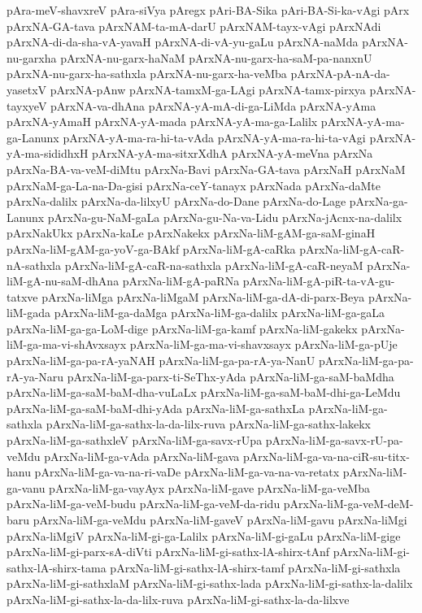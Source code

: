 {pAra-meV-shavxreV
pAra-siVya
pAregx
pAri-BA-Sika
pAri-BA-Si-ka-vAgi
pArx
pArxNA-GA-tava
pArxNAM-ta-mA-darU
pArxNAM-tayx-vAgi
pArxNAdi
pArxNA-di-da-sha-vA-yavaH
pArxNA-di-vA-yu-gaLu
pArxNA-naMda
pArxNA-nu-garxha
pArxNA-nu-garx-haNaM
pArxNA-nu-garx-ha-saM-pa-nanxnU
pArxNA-nu-garx-ha-sathxla
pArxNA-nu-garx-ha-veMba
pArxNA-pA-nA-da-yasetxV
pArxNA-pAnw
pArxNA-tamxM-ga-LAgi
pArxNA-tamx-pirxya
pArxNA-tayxyeV
pArxNA-va-dhAna
pArxNA-yA-mA-di-ga-LiMda
pArxNA-yAma
pArxNA-yAmaH
pArxNA-yA-mada
pArxNA-yA-ma-ga-Lalilx
pArxNA-yA-ma-ga-Lanunx
pArxNA-yA-ma-ra-hi-ta-vAda
pArxNA-yA-ma-ra-hi-ta-vAgi
pArxNA-yA-ma-sididhxH
pArxNA-yA-ma-sitxrXdhA
pArxNA-yA-meVna
pArxNa
pArxNa-BA-va-veM-diMtu
pArxNa-Bavi
pArxNa-GA-tava
pArxNaH
pArxNaM
pArxNaM-ga-La-na-Da-gisi
pArxNa-ceY-tanayx
pArxNada
pArxNa-daMte
pArxNa-dalilx
pArxNa-da-lilxyU
pArxNa-do-Dane
pArxNa-do-Lage
pArxNa-ga-Lanunx
pArxNa-gu-NaM-gaLa
pArxNa-gu-Na-va-Lidu
pArxNa-jAcnx-na-dalilx
pArxNakUkx
pArxNa-kaLe
pArxNakekx
pArxNa-liM-gAM-ga-saM-ginaH
pArxNa-liM-gAM-ga-yoV-ga-BAkf
pArxNa-liM-gA-caRka
pArxNa-liM-gA-caR-nA-sathxla
pArxNa-liM-gA-caR-na-sathxla
pArxNa-liM-gA-caR-neyaM
pArxNa-liM-gA-nu-saM-dhAna
pArxNa-liM-gA-paRNa
pArxNa-liM-gA-piR-ta-vA-gu-tatxve
pArxNa-liMga
pArxNa-liMgaM
pArxNa-liM-ga-dA-di-parx-Beya
pArxNa-liM-gada
pArxNa-liM-ga-daMga
pArxNa-liM-ga-dalilx
pArxNa-liM-ga-gaLa
pArxNa-liM-ga-ga-LoM-dige
pArxNa-liM-ga-kamf
pArxNa-liM-gakekx
pArxNa-liM-ga-ma-vi-shAvxsayx
pArxNa-liM-ga-ma-vi-shavxsayx
pArxNa-liM-ga-pUje
pArxNa-liM-ga-pa-rA-yaNAH
pArxNa-liM-ga-pa-rA-ya-NanU
pArxNa-liM-ga-pa-rA-ya-Naru
pArxNa-liM-ga-parx-ti-SeThx-yAda
pArxNa-liM-ga-saM-baMdha
pArxNa-liM-ga-saM-baM-dha-vuLaLx
pArxNa-liM-ga-saM-baM-dhi-ga-LeMdu
pArxNa-liM-ga-saM-baM-dhi-yAda
pArxNa-liM-ga-sathxLa
pArxNa-liM-ga-sathxla
pArxNa-liM-ga-sathx-la-da-lilx-ruva
pArxNa-liM-ga-sathx-lakekx
pArxNa-liM-ga-sathxleV
pArxNa-liM-ga-savx-rUpa
pArxNa-liM-ga-savx-rU-pa-veMdu
pArxNa-liM-ga-vAda
pArxNa-liM-gava
pArxNa-liM-ga-va-na-ciR-su-titx-hanu
pArxNa-liM-ga-va-na-ri-vaDe
pArxNa-liM-ga-va-na-va-retatx
pArxNa-liM-ga-vanu
pArxNa-liM-ga-vayAyx
pArxNa-liM-gave
pArxNa-liM-ga-veMba
pArxNa-liM-ga-veM-budu
pArxNa-liM-ga-veM-da-ridu
pArxNa-liM-ga-veM-deM-baru
pArxNa-liM-ga-veMdu
pArxNa-liM-gaveV
pArxNa-liM-gavu
pArxNa-liMgi
pArxNa-liMgiV
pArxNa-liM-gi-ga-Lalilx
pArxNa-liM-gi-gaLu
pArxNa-liM-gige
pArxNa-liM-gi-parx-sA-diVti
pArxNa-liM-gi-sathx-lA-shirx-tAnf
pArxNa-liM-gi-sathx-lA-shirx-tama
pArxNa-liM-gi-sathx-lA-shirx-tamf
pArxNa-liM-gi-sathxla
pArxNa-liM-gi-sathxlaM
pArxNa-liM-gi-sathx-lada
pArxNa-liM-gi-sathx-la-dalilx
pArxNa-liM-gi-sathx-la-da-lilx-ruva
pArxNa-liM-gi-sathx-la-da-lilxve
}
